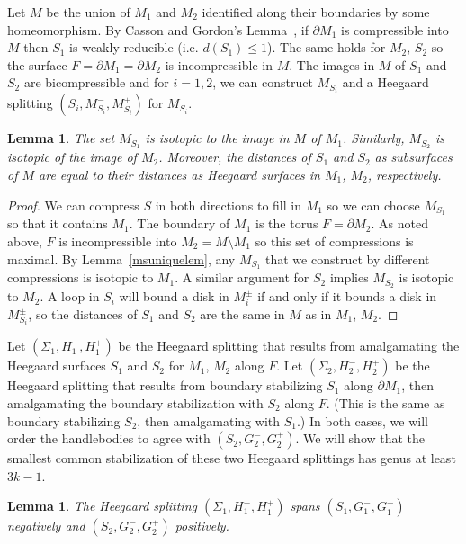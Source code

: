 \documentclass[12pt]{amsart}
\theoremstyle{plain}
\newtheorem{Lem}[Thm]{Lemma}
\theoremstyle{definition}
\begin{document}
Let $M$ be the union of $M_1$ and $M_2$ identified along their boundaries by some homeomorphism.  By Casson and Gordon's Lemma~\cite[Lemma 1.1]{cass:red}, if $\partial M_1$ is compressible into $M$ then $S_1$ is weakly reducible (i.e. $d(S_1) \leq 1$).  The same holds for $M_2$, $S_2$ so the surface $F = \partial M_1 = \partial M_2$ is incompressible in $M$.  The images in $M$ of $S_1$ and $S_2$ are bicompressible and for $i = 1,2$, we can construct $M_{S_i}$ and a Heegaard splitting $(S_i, M_{S_i}^-, M_{S_i}^+)$ for $M_{S_i}$.  

\begin{Lem}
The set $M_{S_1}$ is isotopic to the image in $M$ of $M_1$.  Similarly, $M_{S_2}$ is isotopic of the image of $M_2$.  Moreover, the distances of $S_1$ and $S_2$ as subsurfaces of $M$ are equal to their distances as Heegaard surfaces in $M_1$, $M_2$, respectively.
\end{Lem}

\begin{proof}
We can compress $S$ in both directions to fill in $M_1$ so we can choose $M_{S_1}$ so that it contains $M_1$.  The boundary of $M_1$ is the torus $F = \partial M_2$.  As noted above, $F$ is incompressible into $M_2 = M \setminus M_1$ so this set of compressions is maximal.  By Lemma~\ref{msuniquelem}, any $M_{S_1}$ that we construct by different compressions is isotopic to $M_1$.  A similar argument for $S_2$ implies $M_{S_2}$ is isotopic to $M_2$.  A loop in $S_i$ will bound a disk in $M_i^\pm$ if and only if it bounds a disk in $M_{S_i}^\pm$, so the distances of $S_1$ and $S_2$ are the same in $M$ as in $M_1$, $M_2$.
\end{proof}

Let $(\Sigma_1, H^-_1, H^+_1)$ be the Heegaard splitting that results from amalgamating the Heegaard surfaces $S_1$ and $S_2$ for $M_1$, $M_2$ along $F$.  Let $(\Sigma_2, H^-_2, H^+_2)$ be the Heegaard splitting that results from boundary stabilizing $S_1$ along $\partial M_1$, then amalgamating the boundary stabilization with $S_2$ along $F$.  (This is the same as boundary stabilizing $S_2$, then amalgamating with $S_1$.)  In both cases, we will order the handlebodies to agree with $(S_2, G^-_2, G^+_2)$.  We will show that the smallest common stabilization of these two Heegaard splittings has genus at least $3k-1$.

\begin{Lem}
The Heegaard splitting $(\Sigma_1, H^-_1, H^+_1)$ spans $(S_1, G^-_1, G^+_1)$ negatively and $(S_2, G^-_2, G^+_2)$ positively.
\end{Lem}
\end{document}
